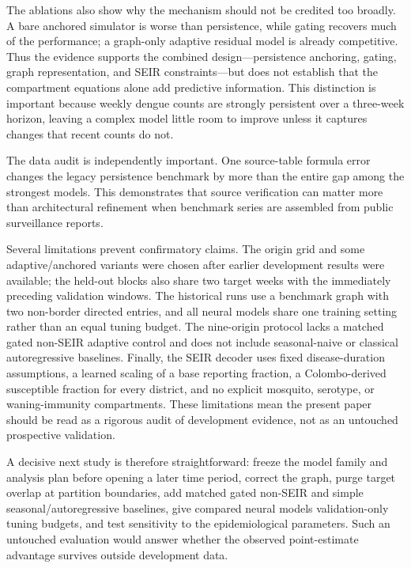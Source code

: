 \documentclass[conference]{IEEEtran}
\begin{document}
The ablations also show why the mechanism should not be credited too broadly.
A bare anchored simulator is worse than persistence, while gating recovers much of the performance; a graph-only adaptive residual model is already competitive.
Thus the evidence supports the combined design---persistence anchoring, gating, graph representation, and SEIR constraints---but does not establish that the compartment equations alone add predictive information.
This distinction is important because weekly dengue counts are strongly persistent over a three-week horizon, leaving a complex model little room to improve unless it captures changes that recent counts do not.

The data audit is independently important.
One source-table formula error changes the legacy persistence benchmark by more than the entire gap among the strongest models.
This demonstrates that source verification can matter more than architectural refinement when benchmark series are assembled from public surveillance reports.

Several limitations prevent confirmatory claims.
The origin grid and some adaptive/anchored variants were chosen after earlier development results were available; the held-out blocks also share two target weeks with the immediately preceding validation windows.
The historical runs use a benchmark graph with two non-border directed entries, and all neural models share one training setting rather than an equal tuning budget.
The nine-origin protocol lacks a matched gated non-SEIR adaptive control and does not include seasonal-naive or classical autoregressive baselines.
Finally, the SEIR decoder uses fixed disease-duration assumptions, a learned scaling of a base reporting fraction, a Colombo-derived susceptible fraction for every district, and no explicit mosquito, serotype, or waning-immunity compartments.
These limitations mean the present paper should be read as a rigorous audit of development evidence, not as an untouched prospective validation.

A decisive next study is therefore straightforward: freeze the model family and analysis plan before opening a later time period, correct the graph, purge target overlap at partition boundaries, add matched gated non-SEIR and simple seasonal/autoregressive baselines, give compared neural models validation-only tuning budgets, and test sensitivity to the epidemiological parameters.
Such an untouched evaluation would answer whether the observed point-estimate advantage survives outside development data.
\end{document}
